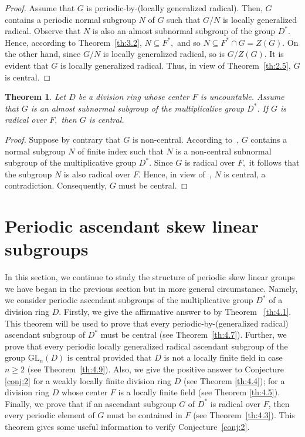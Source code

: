 \documentclass{amsart}
\newtheorem{theorem}{Theorem}[section]
\theoremstyle{definition}
\begin{document}
\begin{proof} Assume that $G$ is periodic-by-(locally generalized radical). Then, $G$ contains a periodic normal subgroup $N$ of $G$ such that $G/N$ is locally generalized radical. Observe that $N$ is also an almost subnormal subgroup of the group $D^*.$ Hence, according to Theorem~\ref{th:3.2}, $N\subseteq F^*,$ and so $N\subseteq F^*\cap G=Z(G).$ On the other hand, since $G/N$ is locally generalized radical, so is $G/Z(G).$ It is evident that $G$ is locally generalized radical. Thus, in view of Theorem~\ref{th:2.5}, $G$ is central.
\end{proof}
\begin{theorem}\label{th:3.15} Let $D$ be a division ring whose center $F$ is uncountable. Assume that $G$ is an almost subnormal subgroup of the multiplicalive group $D^*.$ If $G$ is radical over $F,$ then $G$ is central.
\end{theorem}
\begin{proof} Suppose by contrary that $G$ is non-central. According to~\cite[Theorem 2.1]{Pa_ChNaHa_24}, $G$ contains a normal subgroup $N$ of finite index such that $N$ is a non-central subnormal subgroup of the multiplicative group $D^*.$ Since $G$ is radical over $F,$ it follows that the subgroup $N$ is also radical over $F.$ Hence, in view of~\cite[Theorem 2]{Pa_He_80}, $N$ is central, a contradiction. Consequently, $G$ must be central. 
\end{proof}
\section{Periodic ascendant skew linear subgroups}\label{S4}

In this section, we continue to study the structure of periodic skew linear groups we have began in the previous section but in more general circumstance. Namely, we consider periodic ascendant subgroups of the multiplicative group $D^*$ of a division ring $D$. Firstly, we give the affirmative answer to \cite[Question 1]{Pa_ChuaHai_2026} by Theorem~ \ref{th:4.1}. This theorem will be used to prove that every periodic-by-(generalized radical) ascendant subgroup of $D^*$ must be central (see Theorem~\ref{th:4.7}). Further, we prove that every periodic locally generalized radical ascendant subgroup of the group $\mathrm{GL}_n(D)$ is central provided that $D$ is not a locally finite field in case $n\ge 2$ (see Theorem~\ref{th:4.9}). Also, we give the positive answer to Conjecture \ref{conj:2} for a weakly locally finite division ring $D$ (see Theorem \ref{th:4.4}); for a division ring $D$ whose center $F$ is a locally finite field (see Theorem \ref{th:4.5}). Finally, we prove  that if an ascendant subgroup $G$ of $D^*$ is radical over $F$, then every periodic element of $G$ must be contained in $F$ (see Theorem~\ref{th:4.3}). This theorem gives some useful information to verify Conjecture~\ref{conj:2}. 
\end{document}
